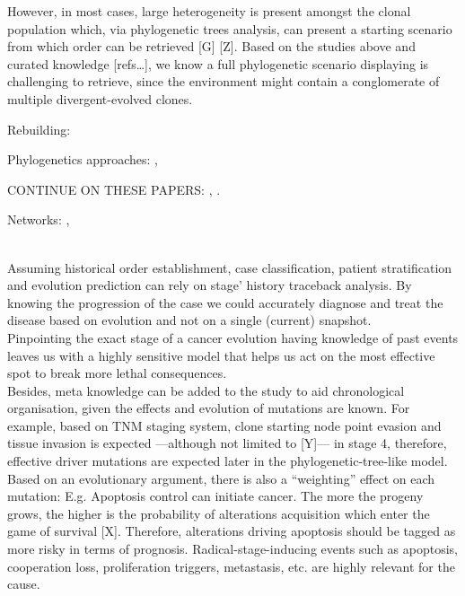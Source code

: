 However, in most cases, large heterogeneity is present amongst the clonal population which, via phylogenetic trees analysis, can present a starting scenario from which order can be retrieved [G] [Z]. Based on the studies above and curated knowledge [refs…], we know a full phylogenetic scenario displaying is challenging to retrieve, since the environment might contain a conglomerate of multiple divergent-evolved clones.

Rebuilding:
\cite{Attolini2010ACancer}

Phylogenetics approaches:
\cite{Beerenwinkel2005Mtreemix:Trees}, \cite{Rahnenfuhrer2005EstimatingScores}

CONTINUE ON THESE PAPERS:
\cite{Desper1999InferringData}, \cite{Desper2001Distance-basedOncogenesis}.

Networks:
\cite{Hjelm2006NewOncogenesis}, \cite{Gerstung2011TheTumorigenesis}

\\

Assuming historical order establishment, case classification, patient stratification and evolution prediction can rely on stage’ history traceback analysis. By knowing the progression of the case we could accurately diagnose and treat the disease based on evolution and not on a single (current) snapshot.\\

Pinpointing the exact stage of a cancer evolution having knowledge of past events leaves us with a highly sensitive model that helps us act on the most effective spot to break more lethal consequences.
\\

Besides, meta knowledge can be added to the study to aid chronological organisation, given the effects and evolution of mutations are known. For example, based on TNM staging system, clone starting node point evasion and tissue invasion is expected —although not limited to [Y]— in stage 4, therefore, effective driver mutations are expected later in the phylogenetic-tree-like model.
\\

Based on an evolutionary argument, there is also a “weighting” effect on each mutation: E.g. Apoptosis control can initiate cancer. The more the progeny grows, the higher is the probability of alterations acquisition which enter the game of survival [X]. Therefore, alterations driving apoptosis should be tagged as more risky in terms of prognosis. Radical-stage-inducing events such as apoptosis, cooperation loss, proliferation triggers, metastasis, etc. are highly relevant for the cause.
\\
\\

